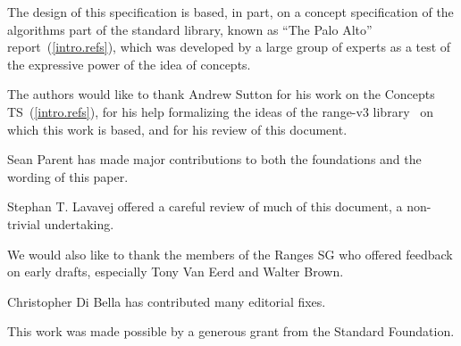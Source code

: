 \setcounter{chapter}{0}

The design of this specification is based, in part, on a concept
specification of the algorithms part of the \Cpp standard library, known
as ``The Palo Alto'' report~(\ref{intro.refs}), which was developed by a large
group of experts as a test of the expressive power of the idea of
concepts.

The authors would like to thank Andrew Sutton for his work on the Concepts TS~(\ref{intro.refs}),
for his help formalizing the ideas of the range-v3 library~\cite{range-v3} on which this
work is based, and for his review of this document.

Sean Parent has made major contributions to both the foundations and the wording of this
paper.

Stephan T. Lavavej offered a careful review of much of this document, a non-trivial undertaking.

We would also like to thank the members of the Ranges SG who offered feedback on early drafts,
especially Tony Van Eerd and Walter Brown.

Christopher Di Bella has contributed many editorial fixes.

This work was made possible by a generous grant from the Standard \Cpp Foundation.
